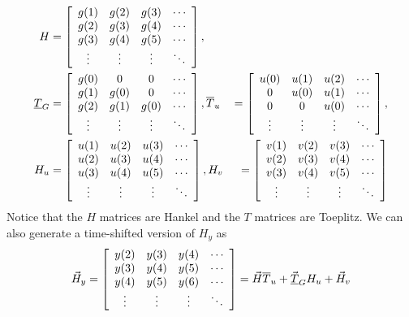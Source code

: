 \begin{align*}
H &= \left[\begin{array}{c c c c}
g(1) & g(2) & g(3) & \cdots \\
g(2) & g(3) & g(4) & \cdots \\
g(3) & g(4) & g(5) & \cdots \\
\vdots & \vdots & \vdots & \ddots
\end{array}\right], \\
\underline{T}_G &= \left[\begin{array}{c c c c}
g(0) & 0 & 0 & \cdots \\
g(1) & g(0) & 0 & \cdots \\
g(2) & g(1) & g(0) & \cdots \\
\vdots & \vdots & \vdots & \ddots
\end{array}\right], \hfill
\overline{T}_u &= \left[\begin{array}{c c c c}
u(0) & u(1) & u(2) & \cdots \\
0 & u(0) & u(1) & \cdots \\
0 & 0 & u(0) & \cdots \\
\vdots & \vdots & \vdots & \ddots
\end{array}\right], \\
H_u &= \left[\begin{array}{c c c c}
u(1) & u(2) & u(3) & \cdots \\
u(2) & u(3) & u(4) & \cdots \\
u(3) & u(4) & u(5) & \cdots \\
\vdots & \vdots & \vdots & \ddots
\end{array}\right], \hfill
H_v &= \left[\begin{array}{c c c c}
v(1) & v(2) & v(3) & \cdots \\
v(2) & v(3) & v(4) & \cdots \\
v(3) & v(4) & v(5) & \cdots \\
\vdots & \vdots & \vdots & \ddots
\end{array}\right]
\end{align*}
Notice that the $H$ matrices are Hankel and the $T$ matrices are Toeplitz.
We can also generate a time-shifted version of $H_y$ as
\begin{align*}
\vec{H}_y = \left[\begin{array}{c c c c}
y(2) & y(3) & y(4) & \cdots \\
y(3) & y(4) & y(5) & \cdots \\
y(4) & y(5) & y(6) & \cdots \\
\vdots & \vdots & \vdots & \ddots
\end{array}\right]
= \vec{H}\overline{T}_u + \vec{\underline{T}}_G H_u + \vec{H}_v
\end{align*}

